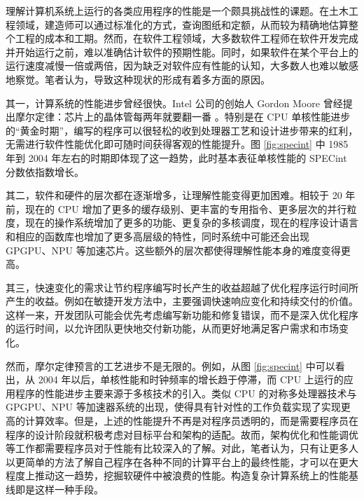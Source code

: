 
理解计算机系统上运行的各类应用程序的性能是一个颇具挑战性的课题。在土木工程领域，建造师可以通过标准化的方式，查询图纸和定额，从而较为精确地估算整个工程的成本和工期。然而，在软件工程领域，大多数软件工程师在软件开发完成并开始运行之前，难以准确估计软件的预期性能。同时，如果软件在某个平台上的运行速度减慢一倍或两倍，{\amend 因为缺乏对软件应有性能的认知}，大多数人也难以敏感地察觉。笔者认为，导致这种现状的形成有着多方面的原因。


其一，计算系统的性能进步曾经很快。Intel 公司的创始人 Gordon Moore 曾经提出摩尔定律：芯片上的晶体管每两年就要翻一番 \cite{MooreLaw}。特别是在 CPU 单核性能进步的“黄金时期”，编写的程序可以很轻松的收到处理器工艺和设计进步带来的红利，无需进行软件性能优化即可随时间获得客观的性能提升。图 \ref{fig:specint} 中 1985 年到 2004 年左右的时期即体现了这一趋势，此时基本表征单核性能的 SPECint 分数依指数增长。

其二，软件和硬件的层次都在逐渐增多，让理解性能变得更加困难。相较于 20 年前，现在的 CPU 增加了更多的缓存级别、更丰富的专用指令、更多层次的并行粒度，现在的操作系统增加了更多的功能、更复杂的多核调度，现在的程序设计语言和相应的函数库也增加了更多高层级的特性，同时系统中可能还会出现 GPGPU、NPU 等加速芯片。这些额外的层次都使得理解性能本身的难度变得更高。

其三，快速变化的需求让节约程序编写时长产生的收益超越了优化程序运行时间所产生的收益。例如在敏捷开发方法中，主要强调快速响应变化和持续交付的价值。这样一来，开发团队可能会优先考虑编写新功能和修复错误，而不是深入优化程序的运行时间，以允许团队更快地交付新功能，从而更好地满足客户需求和市场变化。

然而，摩尔定律预言的工艺进步不是无限的。例如，从图 \ref{fig:specint} 中可以看出，从 2004 年以后，单核性能和时钟频率的增长趋于停滞，而 CPU 上运行的应用程序的性能进步主要来源于多核技术的引入。类似 CPU 的对称多处理器技术与 GPGPU、NPU 等加速器系统的出现，使得具有针对性的工作负载实现了实现更高的计算效率。但是，上述的性能提升不再是对程序员透明的，而是需要程序员在程序的设计阶段就积极考虑对目标平台和架构的适配。故而，架构优化和性能调优等工作都需要程序员对于性能有比较深入的了解。对此，笔者认为，只有让更多人以更简单的方法了解自己程序在各种不同的计算平台上的最终性能，才可以在更大程度上推动这一趋势，挖掘软硬件中被浪费的性能。构造复杂计算系统上的性能基线即是这样一种手段。

